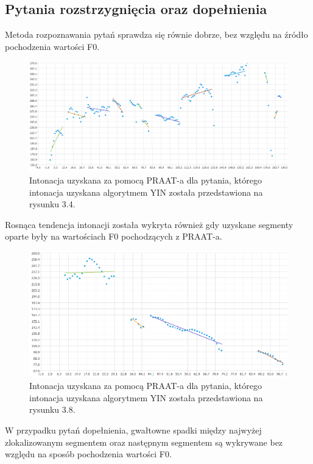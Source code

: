 \documentclass[a4paper,12 pt]{report}
\begin{document}
\subsection{Pytania rozstrzygnięcia oraz dopełnienia}
Metoda rozpoznawania pytań sprawdza się równie dobrze, bez względu na źródło pochodzenia wartości F0.

\begin{figure}[h]
\centering
\includegraphics[scale=0.6]{pytanie_rozstrzygniecia_2_emocje_praat.png}
\caption{Intonacja uzyskana za pomocą PRAAT-a dla pytania, którego intonacja uzyskana algorytmem YIN została przedstawiona na rysunku 3.4.}
\end{figure}
\FloatBarrier
Rosnąca tendencja intonacji została wykryta również gdy uzyskane segmenty oparte były na wartościach F0 pochodzących z PRAAT-a.

\begin{figure}[h]
\centering
\includegraphics[scale=0.7]{pytanie_dopelnienia_praat_2.png}
\caption{Intonacja uzyskana za pomocą PRAAT-a dla pytania, którego intonacja uzyskana algorytmem YIN została przedstawiona na rysunku 3.8.}
\end{figure}
\FloatBarrier

W przypadku pytań dopełnienia, gwałtowne spadki między najwyżej zlokalizowanym segmentem oraz następnym segmentem są wykrywane bez względu na sposób pochodzenia wartości F0.
\end{document}
